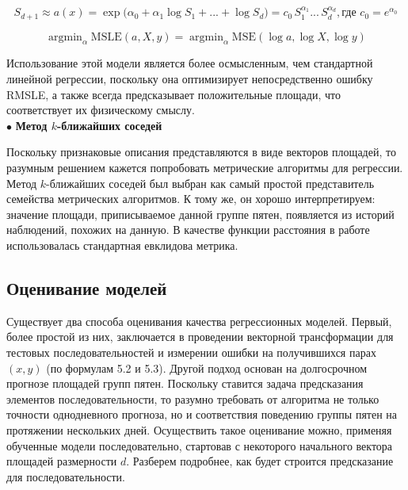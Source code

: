 \documentclass[a4paper, 12pt]{article}
\DeclareMathOperator*{\argmin}{argmin}
\begin{document}
\begin{equation}
    S_{d + 1} \approx a(x) = \exp \Big(\alpha_0 + \alpha_1 \log S_1 + ... + \log S_d \Big) = c_0 \, S_1^{\alpha_1} ... \, S_d^{\alpha_d}, \text{где } c_0 = e^{\alpha_0}
\end{equation}

\begin{equation}
    \argmin_\alpha \text{MSLE}(a, X, y) = \argmin_\alpha \text{MSE}(\log a, \log X, \log y)
\end{equation}

Использование этой модели является более осмысленным, чем стандартной линейной регрессии, поскольку она оптимизирует непосредственно ошибку RMSLE, а также всегда предсказывает положительные площади, что соответствует их физическому смыслу. \\

$\bullet$ \textbf{Метод $k$-ближайших соседей}

Поскольку признаковые описания представляются в виде векторов площадей, то разумным решением кажется попробовать метрические алгоритмы для регрессии. Метод $k$-ближайших соседей был выбран как самый простой представитель семейства метрических алгоритмов. К тому же, он хорошо интерпретируем: значение площади, приписываемое данной группе пятен, появляется из историй наблюдений, похожих на данную. В качестве функции расстояния в работе использовалась стандартная евклидова метрика.

\subsection{Оценивание моделей}

Существует два способа оценивания качества регрессионных моделей. Первый, более простой из них, заключается в проведении векторной трансформации для тестовых последовательностей и измерении ошибки на получившихся парах $(x, y)$ (по формулам 5.2 и 5.3). Другой подход основан на долгосрочном прогнозе площадей групп пятен. Поскольку ставится задача предсказания элементов последовательности, то разумно требовать от алгоритма не только точности однодневного прогноза, но и соответствия поведению группы пятен на протяжении нескольких дней. Осуществить такое оценивание можно, применяя обученные модели последовательно, стартовав с некоторого начального вектора площадей размерности $d$. Разберем подробнее, как будет строится предсказание для последовательности.
\end{document}
